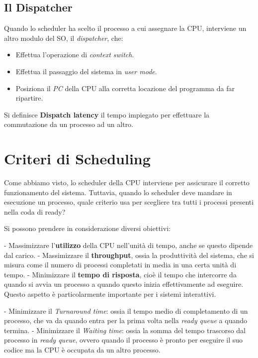 \subsection{Il Dispatcher}
Quando lo scheduler ha scelto il processo a cui assegnare la CPU, interviene un altro modulo del SO, il \textit{dispatcher}, che:
\begin{itemize}
    \item Effettua l'operazione di \textit{context switch}.
    \item Effettua il passaggio del sistema in \textit{user mode}.
    \item Posiziona il \textit{PC} della CPU alla corretta locazione del programma da far ripartire.
\end{itemize}

Si definisce \textbf{Dispatch latency} il tempo impiegato per effettuare la commutazione da un processo ad un altro.

\section{Criteri di Scheduling}
Come abbiamo visto, lo scheduler della CPU interviene per assicurare il corretto funzionamento del sistema. Tuttavia, quando lo scheduler deve mandare in esecuzione un processo, quale criterio usa per scegliere tra tutti i processi presenti nella coda di ready? 

Si possono prendere in considerazione diversi obiettivi:

- Massimizzare l’\textbf{utilizzo} della CPU nell’unità di tempo, anche se questo dipende dal carico.
- Massimizzare il \textbf{throughput}, ossia la produttività del sistema, che si misura come il numero di processi completati in media in una certa unità di tempo.
- Minimizzare il \textbf{tempo di risposta}, cioè il tempo che intercorre da quando si avvia un processo a quando questo inizia effettivamente ad eseguire. Questo aspetto è particolarmente importante per i sistemi interattivi.

- Minimizzare il \textit{Turnaround time}: ossia il tempo medio di completamento di un processo, che va da quando entra per la prima volta nella \textit{ready queue} a quando termina.
- Minimizzare il \textit{Waiting time}: ossia la somma del tempo trascorso dal processo in \textit{ready queue}, ovvero quando il processo è pronto per eseguire il suo codice ma la CPU è occupata da un altro processo.


